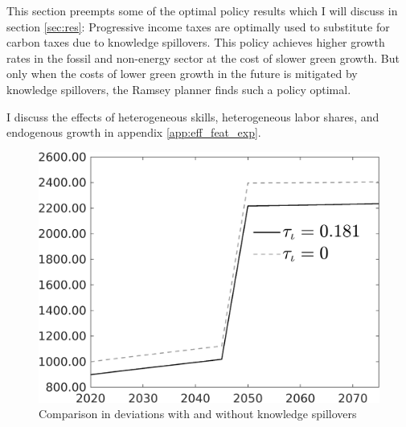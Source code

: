 This section preempts some of the optimal policy results which I will discuss in section \ref{sec:res}: Progressive income taxes are optimally used to substitute for carbon taxes due to knowledge spillovers. This policy achieves higher growth rates in the fossil and non-energy sector at the cost of slower green growth.
 But only when the costs of lower green growth in the future is mitigated by knowledge spillovers, the Ramsey planner finds such a policy optimal. 

I discuss the effects of heterogeneous skills, heterogeneous labor shares, and endogenous growth in appendix \ref{app:eff_feat_exp}. 
 \begin{figure}[h!!]
	\centering
	\caption{Comparison in deviations with and without knowledge spillovers}\label{fig:Limit_nsk0_xgr0_know_Devs}
		\begin{minipage}[]{0.32\textwidth}
		\includegraphics[width=1\textwidth]{../../codding_model/own_basedOnFried/optimalPol_010922_revision/figures/all_13Sept22/CompTauf_bytaul_Reg0_Tauf_spillover0_nsk0_xgr0_knspil1_sep0_LFlimit1_emsbase0_countec0_GovRev0_etaa0.79_lgd1.png}
	\end{minipage}	
\begin{minipage}[]{0.32\textwidth}

\end{minipage}
\end{figure}
